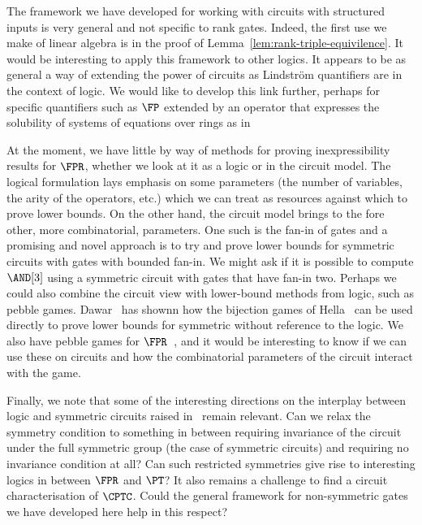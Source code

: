 \documentclass[a4paper,UKenglish]{lipics-v2018}
\begin{document}
The framework we have developed for working with circuits with structured inputs
is very general and not specific to rank gates. Indeed, the first use we make of
linear algebra is in the proof of Lemma~\ref{lem:rank-triple-equivilence}. It
would be interesting to apply this framework to other logics. It appears to be
as general a way of extending the power of circuits as Lindstr\"om quantifiers
are in the context of logic. We would like to develop this link further, perhaps
for specific quantifiers such as $\FP$ extended by an operator that expresses
the solubility of systems of equations over rings as in~\cite{DGHKP}

At the moment, we have little by way of methods for proving inexpressibility
results for $\FPR$, whether we look at it as a logic or in the circuit model.
The logical formulation lays emphasis on some parameters (the number of
variables, the arity of the operators, etc.) which we can treat as resources
against which to prove lower bounds. On the other hand, the circuit model brings
to the fore other, more combinatorial, parameters. One such is the fan-in of
gates and a promising and novel approach is to try and prove lower bounds for
symmetric circuits with gates with bounded fan-in. We might ask if it is
possible to compute $\AND[3]$ using a symmetric circuit with gates that have
fan-in two. Perhaps we could also combine the circuit view with lower-bound
methods from logic, such as pebble games. Dawar~\cite{Dawar2016} has shownn how
the bijection games of Hella~\cite{Hella19961} can be used directly to prove
lower bounds for symmetric without reference to the logic. We also have pebble
games for $\FPR$~\cite{DawarH2012}, and it would be interesting to know if we
can use these on circuits and how the combinatorial parameters of the circuit
interact with the game.

Finally, we note that some of the interesting directions on the interplay
between logic and symmetric circuits raised in~\cite{AndersonD17} remain
relevant. Can we relax the symmetry condition to something in between requiring
invariance of the circuit under the full symmetric group (the case of symmetric
circuits) and requiring no invariance condition at all? Can such restricted
symmetries give rise to interesting logics in between $\FPR$ and $\PT$? It also
remains a challenge to find a circuit characterisation of $\CPTC$. Could the
general framework for non-symmetric gates we have developed here help in this
respect?



% 
\end{document}
